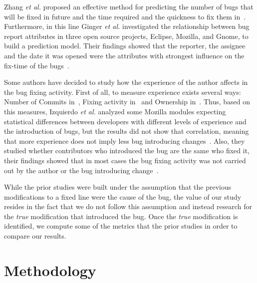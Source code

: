 \documentclass[10pt, conference]{IEEEtran}
\begin{document}

Zhang \emph{et al.} proposed an effective method for predicting the number of bugs that will be fixed in future and the time required and the quickness to fix them in~\cite{zhang2013predicting}. Furthermore, in this line Ginger \emph{et al.} investigated the relationship between bug report attributes in three open source projects, Eclipse, Mozilla, and Gnome, to build a prediction model. Their findings showed that the reporter, the assignee and the date it was opened were the attributes with strongest influence on the fix-time of the bugs~\cite{giger2010predicting}.


Some authors have decided to study how the experience of the author affects in the bug fixing activity. First of all, to measure experience exists several ways: Number of Commits in~\cite{eyolfson2011time}, Fixing activity in~\cite{ahsan2010mining} and Ownership in~\cite{german2004using}. Thus, based on this measures, Izquierdo \emph{et al.} analyzed some Mozilla modules expecting statistical differences between developers with different levels of experience and the introduction of bugs, but the results did not show that correlation, meaning that more experience does not imply less bug introducing changes~\cite{izquierdo2012more}. Also, they studied whether contributors who introduced the bug are the same who fixed it, their findings showed that in most cases the bug fixing activity was not carried out by the author or the bug introducing change~\cite{izquierdo2011developers}.


While the prior studies were built under the assumption that the previous modifications to a fixed line were the cause of the bug, the value of our study resides in the fact that we do not follow this assumption and instead research for the \emph{true} modification that introduced the bug. Once the \emph{true} modification is identified, we compute some of the metrics that the prior studies in order to compare our results. 

\section{Methodology}
\label{sec:methodology}
\end{document}
